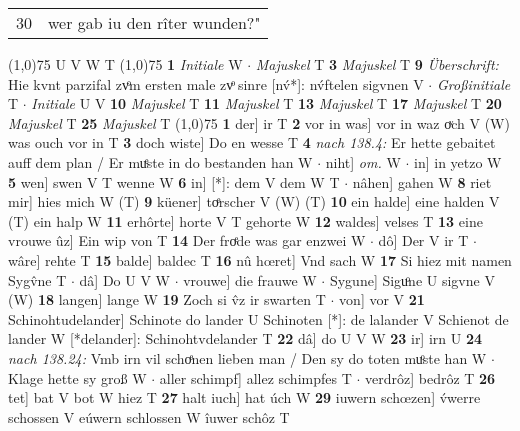 \documentclass[8pt,a4paper,notitlepage]{article}
\begin{document}
\begin{table}[ht]
\begin{minipage}[t]{0.5\linewidth}
\begin{tabular}{rl}
30 & wer gab iu den rîter wunden?"\\ 
\end{tabular}
\scriptsize
\line(1,0){75} \newline
U V W T \newline
\line(1,0){75} \newline
\textbf{1} \textit{Initiale} W   $\cdot$ \textit{Majuskel} T  \textbf{3} \textit{Majuskel} T  \textbf{9} \textit{Überschrift:} Hie kvnt parzifal zvͦm ersten male zvͦ sinre [nv́*]: nv́ftelen sigvnen V   $\cdot$ \textit{Großinitiale} T   $\cdot$ \textit{Initiale} U V  \textbf{10} \textit{Majuskel} T  \textbf{11} \textit{Majuskel} T  \textbf{13} \textit{Majuskel} T  \textbf{17} \textit{Majuskel} T  \textbf{20} \textit{Majuskel} T  \textbf{25} \textit{Majuskel} T  \newline
\line(1,0){75} \newline
\textbf{1} der] ir T \textbf{2} vor in was] vor in waz oͮch V (W) was ouch vor in T \textbf{3} doch wiste] Do en wesse T \textbf{4} \textit{nach 138.4:} Er hette gebaitet auff dem plan / Er muͤste in do bestanden han W   $\cdot$ niht] \textit{om.} W  $\cdot$ in] in yetzo W \textbf{5} wen] swen V T wenne W \textbf{6} in] [*]: dem V dem W T  $\cdot$ nâhen] gahen W \textbf{8} riet mir] hies mich W (T) \textbf{9} küener] toͤrscher V (W) (T) \textbf{10} ein halde] eine halden V (T) ein halp W \textbf{11} erhôrte] horte V T gehorte W \textbf{12} waldes] velses T \textbf{13} eine vrouwe ûz] Ein wip von T \textbf{14} Der froͤde was gar enzwei W  $\cdot$ dô] Der V ir T  $\cdot$ wâre] rehte T \textbf{15} balde] baldec T \textbf{16} nû hœret] Vnd sach W \textbf{17} Si hiez mit namen Sygv̂ne T  $\cdot$ dâ] Do U V W  $\cdot$ vrouwe] die frauwe W  $\cdot$ Sygune] Siguͦne U sigvne V (W) \textbf{18} langen] lange W \textbf{19} Zoch si v̂z ir swarten T  $\cdot$ von] vor V \textbf{21} Schinohtudelander] Schinote do lander U Schinoten [*]: de lalander V Schienot de lander W [*delander]: Schinohtvdelander T \textbf{22} dâ] do U V W \textbf{23} ir] irn U \textbf{24} \textit{nach 138.24:} Vmb irn vil schoͤnen lieben man / Den sy do toten muͦste han W   $\cdot$ Klage hette sy groß W  $\cdot$ aller schimpf] allez schimpfes T  $\cdot$ verdrôz] bedrôz T \textbf{26} tet] bat V bot W hiez T \textbf{27} halt iuch] hat úch W \textbf{29} iuwern schœzen] v́werre schossen V eúwern schlossen W îuwer schôz T \newline
\end{minipage}
\end{table}
\end{document}
